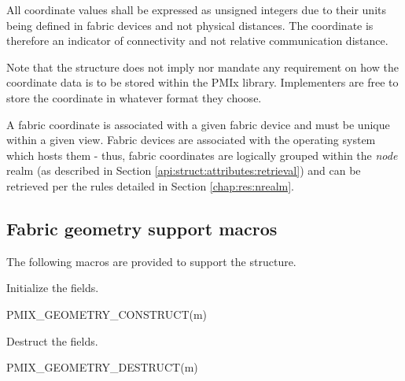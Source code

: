 All coordinate values shall be expressed as unsigned integers due to their units being defined in fabric devices and not physical distances. The coordinate is therefore an indicator of connectivity and not relative communication distance.

\adviceimplstart
Note that the  structure does not imply nor mandate any requirement on how the coordinate data is to be stored within the \ac{PMIx} library. Implementers are free to store the coordinate in whatever format they choose.
\adviceimplend

A fabric coordinate is associated with a given fabric device and must be unique within a given view. Fabric devices are associated with the operating system which hosts them - thus, fabric coordinates are logically grouped within the \emph{node} realm (as described in Section \ref{api:struct:attributes:retrieval}) and can be retrieved per the rules detailed in Section \ref{chap:res:nrealm}.


\subsection{Fabric geometry support macros}
\label{api:netgeom:macros}

The following macros are provided to support the  structure.


Initialize the  fields.

\cspecificstart
\begin{codepar}
PMIX_GEOMETRY_CONSTRUCT(m)
\end{codepar}
\cspecificend

\begin{arglist}
\end{arglist}


Destruct the  fields.

\cspecificstart
\begin{codepar}
PMIX_GEOMETRY_DESTRUCT(m)
\end{codepar}
\cspecificend

